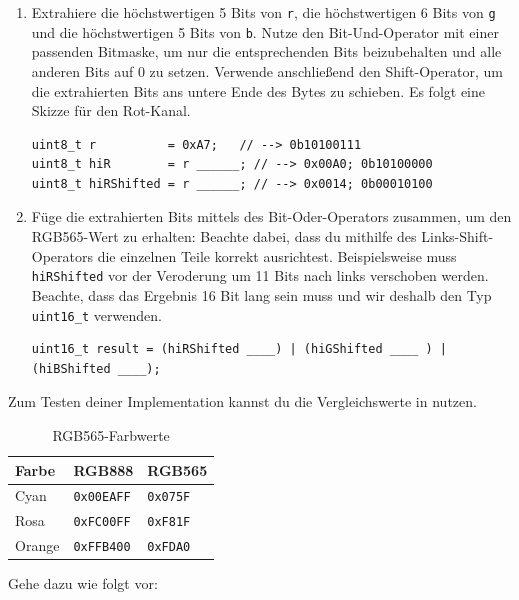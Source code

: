 \begin{enumerate}
\item 
Extrahiere die höchstwertigen 5 Bits von \lstinline|r|, die höchstwertigen 6 Bits von \lstinline|g| und die höchstwertigen 5 Bits von \lstinline|b|.
Nutze den Bit-Und-Operator mit einer passenden Bitmaske, um nur die entsprechenden Bits beizubehalten und alle anderen Bits auf 0 zu setzen.
Verwende anschließend den Shift-Operator, um die extrahierten Bits ans untere Ende des Bytes zu schieben.
Es folgt eine Skizze für den Rot-Kanal.
\begin{lstlisting}
uint8_t r          = 0xA7;   // --> 0b10100111
uint8_t hiR        = r ______; // --> 0x00A0; 0b10100000
uint8_t hiRShifted = r ______; // --> 0x0014; 0b00010100
\end{lstlisting}
\item 
Füge die extrahierten Bits mittels des Bit-Oder-Operators zusammen, um den RGB565-Wert zu erhalten:
Beachte dabei, dass du mithilfe des Links-Shift-Operators die einzelnen Teile korrekt ausrichtest.
Beispielsweise muss \lstinline|hiRShifted| vor der Veroderung um 11 Bits nach links verschoben werden.
Beachte, dass das Ergebnis 16 Bit lang sein muss und wir deshalb den Typ \lstinline|uint16_t| verwenden.
\begin{lstlisting}
uint16_t result = (hiRShifted ____) | (hiGShifted ____ ) | (hiBShifted ____);
\end{lstlisting}
\end{enumerate}
Zum Testen deiner Implementation kannst du die Vergleichswerte in  nutzen.
\begin{table}[]
	\centering
	\caption{RGB565-Farbwerte}
	\label{tab:rgb565Table}
	\begin{tabular}{lll}
        \toprule
		\textbf{Farbe} & \textbf{RGB888} & \textbf{RGB565} \\
        \midrule
		Cyan   & \lstinline|0x00EAFF| & \lstinline|0x075F| \\
		Rosa   & \lstinline|0xFC00FF| & \lstinline|0xF81F| \\
		Orange & \lstinline|0xFFB400| & \lstinline|0xFDA0| \\
        \bottomrule
	\end{tabular}
\end{table}
Gehe dazu wie folgt vor:
